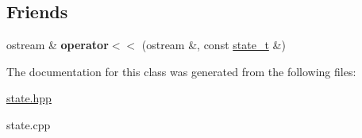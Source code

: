 \subsection*{Friends}
\begin{DoxyCompactItemize}
\item 
\hypertarget{classstate__t_a0e7fdc3ce3276e68bc3e90cc4b6a1d01}{}\label{classstate__t_a0e7fdc3ce3276e68bc3e90cc4b6a1d01} 
ostream \& {\bfseries operator$<$$<$} (ostream \&, const \hyperlink{classstate__t}{state\+\_\+t} \&)
\end{DoxyCompactItemize}


The documentation for this class was generated from the following files\+:\begin{DoxyCompactItemize}
\item 
\hyperlink{state_8hpp}{state.\+hpp}\item 
state.\+cpp\end{DoxyCompactItemize}
